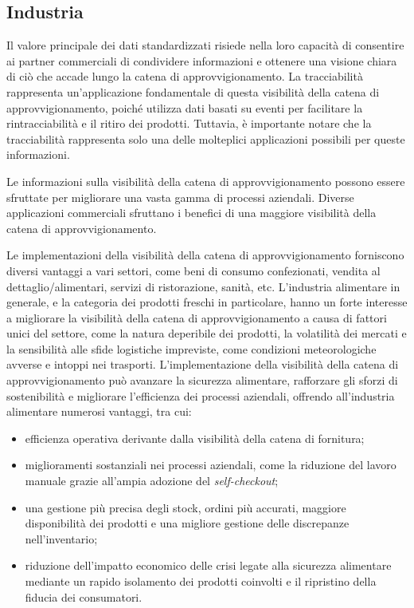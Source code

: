 \subsection{Industria}

Il valore principale dei dati standardizzati risiede nella loro capacità di consentire ai partner commerciali di condividere informazioni e ottenere una visione chiara di ciò che accade lungo la catena di approvvigionamento. La tracciabilità rappresenta un'applicazione fondamentale di questa visibilità della catena di approvvigionamento, poiché utilizza dati basati su eventi per facilitare la rintracciabilità e il ritiro dei prodotti. Tuttavia, è importante notare che la tracciabilità rappresenta solo una delle molteplici applicazioni possibili per queste informazioni.

Le informazioni sulla visibilità della catena di approvvigionamento possono essere sfruttate per migliorare una vasta gamma di processi aziendali. Diverse applicazioni commerciali sfruttano i benefici di una maggiore visibilità della catena di approvvigionamento.

Le implementazioni della visibilità della catena di approvvigionamento forniscono diversi vantaggi a vari settori, come beni di consumo confezionati, vendita al dettaglio/alimentari, servizi di ristorazione, sanità, etc. L'industria alimentare in generale, e la categoria dei prodotti freschi in particolare, hanno un forte interesse a migliorare la visibilità della catena di approvvigionamento a causa di fattori unici del settore, come la natura deperibile dei prodotti, la volatilità dei mercati e la sensibilità alle sfide logistiche impreviste, come condizioni meteorologiche avverse e intoppi nei trasporti. L'implementazione della visibilità della catena di approvvigionamento può avanzare la sicurezza alimentare, rafforzare gli sforzi di sostenibilità e migliorare l'efficienza dei processi aziendali, offrendo all'industria alimentare numerosi vantaggi, tra cui:

\begin{itemize}
    \item efficienza operativa derivante dalla visibilità della catena di fornitura;
    \item miglioramenti sostanziali nei processi aziendali, come la riduzione del lavoro manuale grazie all'ampia adozione del \textit{self-checkout};
    \item una gestione più precisa degli stock, ordini più accurati, maggiore disponibilità dei prodotti e una migliore gestione delle discrepanze nell'inventario;
    \item riduzione dell'impatto economico delle crisi legate alla sicurezza alimentare mediante un rapido isolamento dei prodotti coinvolti e il ripristino della fiducia dei consumatori.
\end{itemize}

